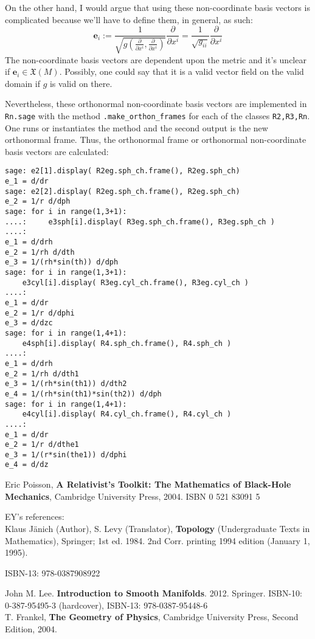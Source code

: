 \documentclass[10pt, twoside]{amsart}
\begin{document}
\begin{multicols*}{2}
On the other hand, I would argue that using these non-coordinate basis vectors is complicated because we'll have to define them, in general, as such:
\begin{equation}
  \mathbf{e}_i := \frac{1}{ \sqrt{ g(\frac{ \partial }{ \partial x^i}, \frac{ \partial }{ \partial x^i} ) } } \frac{ \partial }{ \partial x^i } = \frac{1}{\sqrt{g_{ii}}} \frac{ \partial }{ \partial x^i}
\end{equation}
The non-coordinate basis vectors are dependent upon the metric and it's unclear if $\mathbf{e}_i \in \mathfrak{X}(M)$. Possibly, one could say that it is a valid vector field on the valid domain if $g$ is valid on there.  

Nevertheless, these orthonormal non-coordinate basis vectors are implemented in \verb|Rn.sage| with the method \verb|.make_orthon_frames| for each of the classes \verb|R2,R3,Rn|.  One runs or instantiates the method and the second output is the new orthonormal frame.  Thus, the orthonormal frame or orthonormal non-coordinate basis vectors are calculated:
\begin{lstlisting}
sage: e2[1].display( R2eg.sph_ch.frame(), R2eg.sph_ch)
e_1 = d/dr
sage: e2[2].display( R2eg.sph_ch.frame(), R2eg.sph_ch)
e_2 = 1/r d/dph
sage: for i in range(1,3+1):
....:     e3sph[i].display( R3eg.sph_ch.frame(), R3eg.sph_ch )
....:     
e_1 = d/drh
e_2 = 1/rh d/dth
e_3 = 1/(rh*sin(th)) d/dph
sage: for i in range(1,3+1):
    e3cyl[i].display( R3eg.cyl_ch.frame(), R3eg.cyl_ch )
....:     
e_1 = d/dr
e_2 = 1/r d/dphi
e_3 = d/dzc
sage: for i in range(1,4+1):
    e4sph[i].display( R4.sph_ch.frame(), R4.sph_ch )
....:     
e_1 = d/drh
e_2 = 1/rh d/dth1
e_3 = 1/(rh*sin(th1)) d/dth2
e_4 = 1/(rh*sin(th1)*sin(th2)) d/dph
sage: for i in range(1,4+1):
    e4cyl[i].display( R4.cyl_ch.frame(), R4.cyl_ch )
....:     
e_1 = d/dr
e_2 = 1/r d/dthe1
e_3 = 1/(r*sin(the1)) d/dphi
e_4 = d/dz
\end{lstlisting}


\end{multicols*}

\begin{thebibliography}{9}
Eric Poisson, 
\textbf{A Relativist's Toolkit: The Mathematics of Black-Hole Mechanics},
Cambridge University Press, 
2004.
ISBN 0 521 83091 5

EY's references: \\

Klaus Jänich (Author), S. Levy (Translator), \textbf{Topology} (Undergraduate Texts in Mathematics), Springer; 1st ed. 1984. 2nd Corr. printing 1994 edition (January 1, 1995).

ISBN-13: 978-0387908922

John M. Lee.  \textbf{Introduction to Smooth Manifolds}.  2012. Springer.   ISBN-10: 0-387-95495-3 (hardcover), ISBN-13: 978-0387-95448-6  \\

T. Frankel,
\textbf{The Geometry of Physics}, 
Cambridge University Press, 
Second Edition,
2004.



\end{thebibliography}
\end{document}
